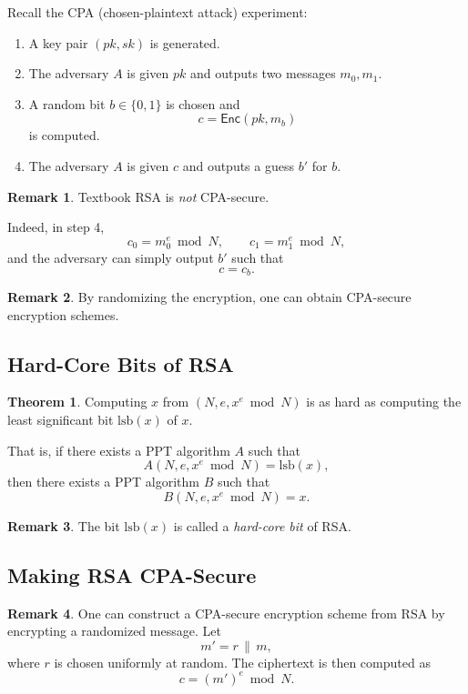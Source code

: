 \documentclass[11pt]{article}
\theoremstyle{definition}
\newtheorem{theorem}{Theorem}[section]
\newtheorem{remark}{Remark}[section]
\theoremstyle{proof}
\newcommand{\Enc}{\mathsf{Enc}}
\begin{document}
	Recall the CPA (chosen-plaintext attack) experiment:
	
	\begin{enumerate}
		\item A key pair $(pk,sk)$ is generated.
		\item The adversary $A$ is given $pk$ and outputs two messages $m_0,m_1$.
		\item A random bit $b \in \{0,1\}$ is chosen and
		$$
		c = \Enc(pk,m_b)
		$$
		is computed.
		\item The adversary $A$ is given $c$ and outputs a guess $b'$ for $b$.
	\end{enumerate}
	
	\begin{remark}
		Textbook RSA is \emph{not} CPA-secure.
	\end{remark}
	
	Indeed, in step 4,
	$$
	c_0 = m_0^e \bmod N, \qquad
	c_1 = m_1^e \bmod N,
	$$
	and the adversary can simply output $b'$ such that
	$$
	c = c_b.
	$$
	
	\begin{remark}
		By randomizing the encryption, one can obtain CPA-secure encryption schemes.
	\end{remark}
	
	\subsection{Hard-Core Bits of RSA}
	
	\begin{theorem}
		Computing $x$ from $(N,e,x^e \bmod N)$ is as hard as computing
		the least significant bit $\mathrm{lsb}(x)$ of $x$.
	\end{theorem}
	
	That is, if there exists a PPT algorithm $A$ such that
	$$
	A(N,e,x^e \bmod N) = \mathrm{lsb}(x),
	$$
	then there exists a PPT algorithm $B$ such that
	$$
	B(N,e,x^e \bmod N) = x.
	$$
	
	\begin{remark}
		The bit $\mathrm{lsb}(x)$ is called a \emph{hard-core bit} of RSA.
	\end{remark}
	
	\subsection{Making RSA CPA-Secure}
	
	\begin{remark}
		One can construct a CPA-secure encryption scheme from RSA by encrypting
		a randomized message.
		Let
		$$
		m' = r \,\|\, m,
		$$
		where $r$ is chosen uniformly at random.
		The ciphertext is then computed as
		$$
		c = (m')^e \bmod N.
		$$
	\end{remark}
\end{document}
